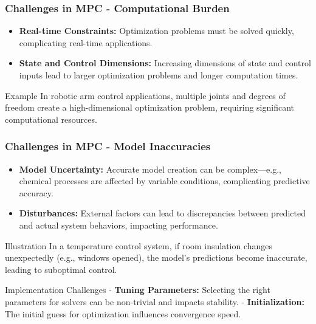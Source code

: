 \documentclass[aspectratio=169]{beamer}
\begin{document}
\begin{frame}[fragile]
    \frametitle{Challenges in MPC - Computational Burden}
    \begin{itemize}
        \item \textbf{Real-time Constraints:} Optimization problems must be solved quickly, complicating real-time applications.
        \item \textbf{State and Control Dimensions:} Increasing dimensions of state and control inputs lead to larger optimization problems and longer computation times.
    \end{itemize}
    
    \begin{block}{Example}
        In robotic arm control applications, multiple joints and degrees of freedom create a high-dimensional optimization problem, requiring significant computational resources.
    \end{block}
\end{frame}

\begin{frame}[fragile]
    \frametitle{Challenges in MPC - Model Inaccuracies}
    \begin{itemize}
        \item \textbf{Model Uncertainty:} Accurate model creation can be complex—e.g., chemical processes are affected by variable conditions, complicating predictive accuracy.
        \item \textbf{Disturbances:} External factors can lead to discrepancies between predicted and actual system behaviors, impacting performance.
    \end{itemize}

    \begin{block}{Illustration}
        In a temperature control system, if room insulation changes unexpectedly (e.g., windows opened), the model's predictions become inaccurate, leading to suboptimal control.
    \end{block}

    \begin{block}{Implementation Challenges}
        - \textbf{Tuning Parameters:} Selecting the right parameters for solvers can be non-trivial and impacts stability.
        - \textbf{Initialization:} The initial guess for optimization influences convergence speed.
    \end{block}
\end{frame}
\end{document}
